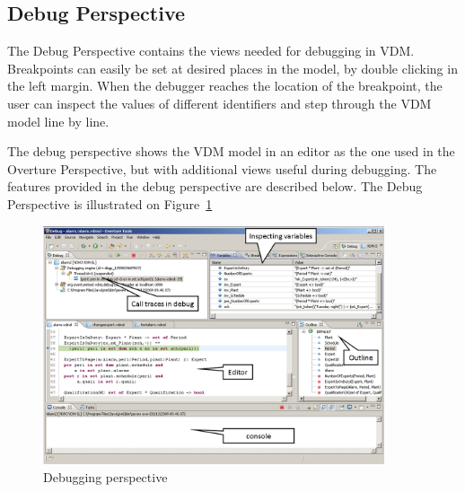 \documentclass{overturerepsec}
\begin{document}
\subsection{Debug Perspective}

The Debug Perspective contains the views
needed for debugging in VDM. Breakpoints can easily be set at desired
places in the model, by double clicking in the left margin. When the
debugger reaches the location of the breakpoint, the user can inspect
the values of different identifiers and step through the VDM model
line by line.
 
The debug perspective shows the VDM model in an editor as the one used in the
Overture Perspective, but with additional views useful during
debugging. The features provided in the debug perspective are described below.
The Debug Perspective is illustrated on Figure~\ref{fig:userguide:DebuggingVDM}

\begin{figure}[htp]
\begin{center}
  \includegraphics[width=380px]{figures/DebuggingVDM}
  \caption[Debugging perspective]{Debugging perspective}
  \label{fig:userguide:DebuggingVDM}
\end{center}
\end{figure}

\end{document}
